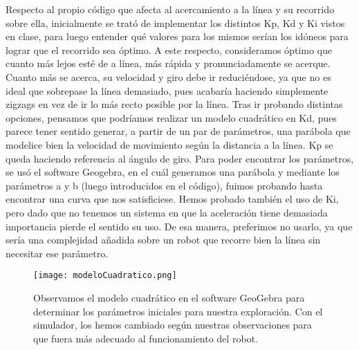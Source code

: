 \documentclass{article}
\begin{document}
Respecto al propio código que afecta al acercamiento a la línea y su recorrido sobre ella, inicialmente se trató de implementar los distintos Kp, Kd y Ki vistos en clase, para luego entender qué valores para los mismos serían los idóneos para lograr que el recorrido sea óptimo. A este respecto, consideramos óptimo que cuanto más lejos esté de a línea, más rápida y pronunciadamente se acerque. Cuanto más se acerca, su velocidad y giro debe ir reduciéndose, ya que no es ideal que sobrepase la línea demasiado, pues acabaría haciendo simplemente zigzags en vez de ir lo más recto posible por la línea. Tras ir probando distintas opciones, pensamos que podríamos realizar un modelo cuadrático en Kd, pues parece tener sentido generar, a partir de un par de parámetros, una parábola que modelice bien la velocidad de movimiento según la distancia a la línea. Kp se queda haciendo referencia al ángulo de giro. Para poder encontrar los parámetros, se usó el software Geogebra, en el cuál generamos una parábola y mediante los parámetros a y b (luego introducidos en el código), fuimos probando hasta encontrar una curva que nos satisficiese. Hemos probado también el uso de Ki, pero dado que no tenemos un sistema en que la aceleración tiene demasiada importancia pierde el sentido su uso. De esa manera, preferimos no usarlo, ya que sería una complejidad añadida sobre un robot que recorre bien la línea sin necesitar ese parámetro.


\begin{figure}[H]
    \centering
    \texttt{[image: modeloCuadratico.png]}
    \caption{Observamos el modelo cuadrático en el software GeoGebra para determinar los parámetros iniciales para nuestra exploración. Con el simulador, los hemos cambiado según nuestras observaciones para que fuera más adecuado al funcionamiento del robot.}
    \label{fig:modeloCuadratico}
\end{figure}
\end{document}
